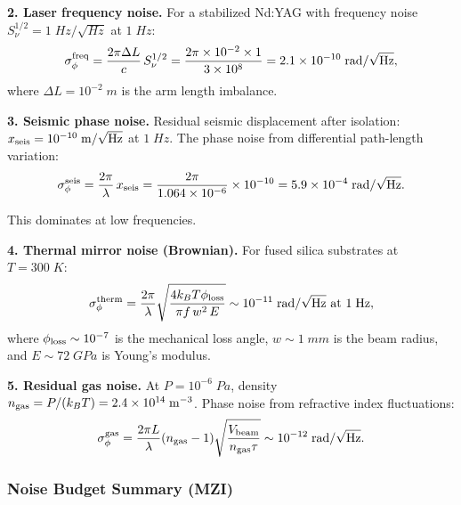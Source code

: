 \documentclass[aps,prd,twocolumn,superscriptaddress,nofootinbib]{revtex4-2}
\newcommand{\ee}[1]{\times 10^{#1}}
\begin{document}
\textbf{2. Laser frequency noise.}
For a stabilized Nd:YAG with frequency noise
$S_\nu^{1/2} = 1\;\si{Hz/\sqrt{Hz}}$ at $1\;\si{Hz}$:
\begin{equation}
\sigma_\phi^{\rm freq} = \frac{2\pi\Delta L}{c}\,S_\nu^{1/2}
= \frac{2\pi\times10^{-2}\times 1}{3\ee{8}} = 2.1\ee{-10}\;\si{rad/\sqrt{Hz}},
\end{equation}
where $\Delta L = 10^{-2}\;\si{m}$ is the arm length imbalance.

\textbf{3. Seismic phase noise.}
Residual seismic displacement after isolation:
$x_{\rm seis} = 10^{-10}\;\si{m/\sqrt{Hz}}$ at $1\;\si{Hz}$.
The phase noise from differential path-length variation:
\begin{equation}
\sigma_\phi^{\rm seis} = \frac{2\pi}{\lambda}\,x_{\rm seis}
= \frac{2\pi}{1.064\ee{-6}}\times10^{-10} = 5.9\ee{-4}\;\si{rad/\sqrt{Hz}}.
\end{equation}

This dominates at low frequencies.

\textbf{4. Thermal mirror noise (Brownian).}
For fused silica substrates at $T = 300\;\si{K}$:
\begin{equation}
\sigma_\phi^{\rm therm} = \frac{2\pi}{\lambda}\sqrt{\frac{4k_BT\phi_{\rm loss}}{\pi f\,w^2\,E}}
\sim 10^{-11}\;\si{rad/\sqrt{Hz}} \text{ at } 1\;\si{Hz},
\end{equation}
where $\phi_{\rm loss} \sim 10^{-7}$ is the mechanical loss angle,
$w \sim 1\;\si{mm}$ is the beam radius, and $E \sim 72\;\si{GPa}$
is Young's modulus.

\textbf{5. Residual gas noise.}
At $P = 10^{-6}\;\si{Pa}$, density $n_{\rm gas} = P/(k_BT) = 2.4\ee{14}\;\si{m^{-3}}$.
Phase noise from refractive index fluctuations:
\begin{equation}
\sigma_\phi^{\rm gas} = \frac{2\pi L}{\lambda}(n_{\rm gas}-1)\sqrt{\frac{V_{\rm beam}}{n_{\rm gas}\tau}}
\sim 10^{-12}\;\si{rad/\sqrt{Hz}}.
\end{equation}

\subsubsection{Noise Budget Summary (MZI)}
\end{document}
